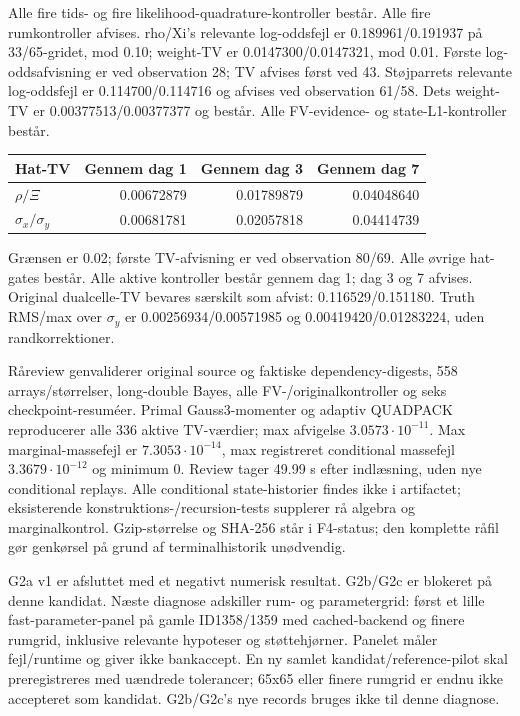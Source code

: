 Alle fire tids- og fire likelihood-quadrature-kontroller består.
Alle fire rumkontroller afvises. rho/Xi's relevante log-oddsfejl er
0.189961/0.191937 på 33/65-gridet, mod 0.10; weight-TV er
0.0147300/0.0147321, mod 0.01. Første log-oddsafvisning er ved
observation 28; TV afvises først ved 43. Støjparrets relevante
log-oddsfejl er 0.114700/0.114716 og afvises ved observation 61/58.
Dets weight-TV er 0.00377513/0.00377377 og består.
Alle FV-evidence- og state-L1-kontroller består.

\begin{center}
\begin{tabular}{lrrr}
\toprule
Hat-TV & Gennem dag 1 & Gennem dag 3 & Gennem dag 7\\
\midrule
$\rho/\Xi$ & 0.00672879 & 0.01789879 & 0.04048640\\
$\sigma_x/\sigma_y$ & 0.00681781 & 0.02057818 & 0.04414739\\
\bottomrule
\end{tabular}
\end{center}
Grænsen er 0.02; første TV-afvisning er ved observation 80/69.
Alle øvrige hat-gates består. Alle aktive kontroller består gennem dag 1;
dag 3 og 7 afvises. Original dualcelle-TV bevares særskilt som afvist:
0.116529/0.151180. Truth RMS/max over $\sigma_y$ er
0.00256934/0.00571985 og 0.00419420/0.01283224, uden randkorrektioner.

Råreview genvaliderer original source og faktiske dependency-digests,
558 arrays/størrelser, long-double Bayes, alle FV-/originalkontroller og
seks checkpoint-resuméer. Primal Gauss3-momenter og adaptiv QUADPACK
reproducerer alle 336 aktive TV-værdier; max afvigelse $3.0573\cdot10^{-11}$.
Max marginal-massefejl er $7.3053\cdot10^{-14}$, max registreret conditional
massefejl $3.3679\cdot10^{-12}$ og minimum 0. Review tager 49.99 s efter
indlæsning, uden nye conditional replays. Alle conditional state-historier
findes ikke i artifactet; eksisterende konstruktions-/recursion-tests
supplerer rå algebra og marginalkontrol. Gzip-størrelse og SHA-256 står i
F4-status; den komplette råfil gør genkørsel på grund af terminalhistorik unødvendig.

G2a v1 er afsluttet med et negativt numerisk resultat. G2b/G2c er
blokeret på denne kandidat. Næste diagnose adskiller rum- og parametergrid:
først et lille fast-parameter-panel på gamle ID1358/1359 med cached-backend
og finere rumgrid, inklusive relevante hypoteser og støttehjørner.
Panelet måler fejl/runtime og giver ikke bankaccept. En ny samlet
kandidat/reference-pilot skal preregistreres med uændrede tolerancer;
65x65 eller finere rumgrid er endnu ikke accepteret som kandidat.
G2b/G2c's nye records bruges ikke til denne diagnose.

